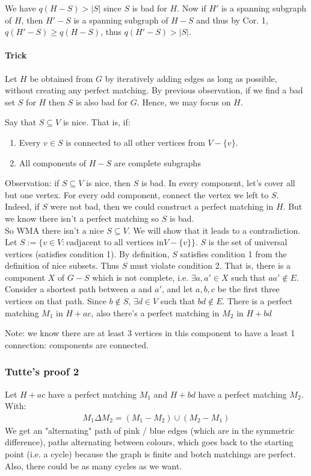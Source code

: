 		We have $q(H -S) > |S|$ since $S$ is bad for $H$. Now if $H'$ is a spanning subgraph of $H$, then $H' - S$ is a spanning subgraph of $H -S$ and thus by Cor. 1, $q(H' - S) \geq q(H - S)$, thus $q(H' - S) > |S|$.
		
		\paragraph{Trick} Let $H$ be obtained from $G$ by iteratively adding edges as long as possible, without creating any perfect matching. By previous observation, if we find a bad set $S$ for $H$ then $S$ is also bad for $G$. Hence, we may focus on $H$.
		
		Say that $S \subseteq V$ is nice. That is, if:
		\begin{enumerate}
			\item Every $v \in S$ is connected to all other vertices from $V - \{ v \}$.
			\item All components of $H - S$ are complete subgraphs
		\end{enumerate}
		Observation: if $S \subseteq V$ is nice, then $S$ is bad. In every component, let's cover all but one vertex. For every odd component, connect the vertex we left to $S$. Indeed, if $S$ were not bad, then we could construct a perfect matching in $H$. But we know there isn't a perfect matching so $S$ is bad.\\
		
		So WMA there isn't a nice $S \subseteq V$. We will show that it leads to a contradiction. Let $S := \{ v \in V : v \text{adjacent to all vertices in} V - \{ v \} \}$. $S$ is the set of universal vertices (satisfies condition 1). By definition, $S$ satisfies condition 1 from the definition of nice subsets. Thus $S$ must violate condition 2. That is, there is a component $X$ of $G - S$ which is not complete, i.e. $\exists a, a' \in X$ such that $aa' \notin E$. Consider a shortest path between $a$ and $a'$, and let $a, b, c$ be the first three vertices on that path. Since $b \notin S$, $\exists d \in V$ such that $bd \notin E$. There is a perfect matching $M_1$ in $H + ac$, also there's a perfect matching in $M_2$ in $H + bd$ 
		
		Note: we know there are at least 3 vertices in this component to have a least 1 connection: components are connected.

		\subsubsection{Tutte's proof 2}
			Let $H + ac$ have a perfect matching $M_1$ and $H + bd $ have a perfect matching $M_2$.
			With:
			\begin{eqnarray}
				M_1 \Delta M_2 = (M_1 - M_2) \cup (M_2 - M_1)
			\end{eqnarray}
			We get an "alternating" path of pink / blue edges (which are in the symmetric difference), paths alternating between colours, which goes back to the starting point (i.e. a cycle) because the graph is finite and botch matchings are perfect. Also, there could be as many cycles as we want. \\
			
